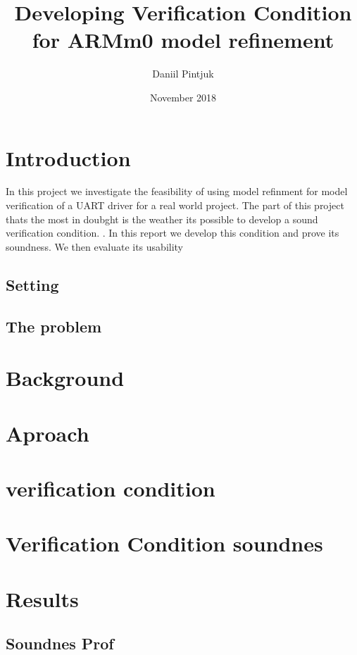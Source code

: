 \documentclass{article}
\title{Developing Verification Condition for ARMm0 model refinement}
\author{Daniil Pintjuk}
\date{November 2018}
\begin{document}
\maketitle

\section{Introduction}
In this project we investigate the feasibility of using model refinment for model verification of a UART driver for a real world project. The part of this project thats the most in doubght is the weather its possible to develop a sound verification condition. . In this report we develop this condition and prove its soundness. We then evaluate its usability 



\subsection{Setting}

\subsection {The problem}


\section{Background}


\section{Aproach}

\section{verification condition}

\section{Verification Condition soundnes}

\section{}

\section{Results}
\subsection{Soundnes Prof}
\end{document}
